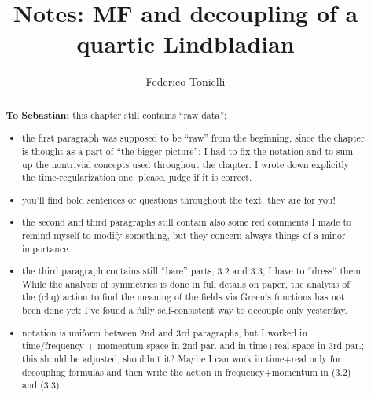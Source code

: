 \documentclass[a4paper,11pt, english]{article}
\title{Notes: MF and decoupling of a quartic Lindbladian}
\author{Federico Tonielli}
\newcommand\blankpage{%
    \null
    \thispagestyle{empty}%
    \addtocounter{page}{-1}%
    \newpage}
\theoremstyle{remark}
\begin{document}
 \maketitle
 
 \tableofcontents
 \blankpage
 
\begin{abstract}
 \textbf{To Sebastian:} this chapter still contains ``raw data'';
 \begin{itemize}
  \item the first  paragraph was supposed to be ``raw'' from the beginning, since the chapter is thought as a part of ``the bigger picture'': I had to fix the notation and to sum up the nontrivial concepts used throughout the chapter. I wrote down explicitly the time-regularization one; please, judge if it is correct.
  \item you'll find bold sentences or questions throughout the text, they are for you!
  \item the second and third paragraphs still contain also some red comments I made to remind myself to modify something, but they concern always things of a minor importance.
  \item the third paragraph contains still ``bare'' parts, 3.2 and 3.3, I have to ``dress`` them. While the analysis of symmetries is done in full details on paper, the analysis of the (cl,q) action to find the meaning of the fields via Green's functions has not been done yet: I've found a fully self-consistent way to decouple only yesterday.
  \item notation is uniform between 2nd and 3rd paragraphs, but I worked in time/frequency + momentum space in 2nd par. and in time+real space in 3rd par.; this should be adjusted, shouldn't it? Maybe I can work in time+real only for decoupling formulas and then write the action in frequency+momentum in (3.2) and (3.3).
 \end{itemize}
 \pagebreak

\end{abstract}
\end{document}
